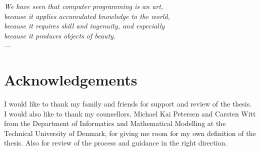 

\begin{flushright}{\slshape    
We have seen that computer programming is an art, \\ 
because it applies accumulated knowledge to the world, \\ 
because it requires skill and ingenuity, and especially \\
because it produces objects of beauty.} \\ \medskip
---  \citep{knuth:1974}
\end{flushright}

\bigskip


\begingroup

\let\clearpage\relax
\let\cleardoublepage\relax
\let\cleardoublepage\relax

\chapter*{Acknowledgements} %

\noindent I would like to thank my family and friends for support and review of the thesis. I would also like to thank my counsellors, Michael Kai Petersen and Carsten Witt from the Department of Informatics and Mathematical Modelling at the Technical University of Denmark, for giving me room for my own definition of the thesis. Also for review of the process and guidance in the right direction.

\endgroup
